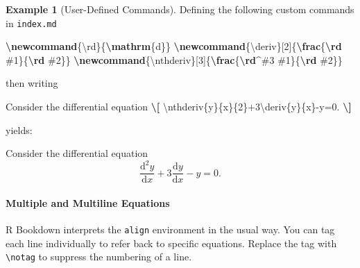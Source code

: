 \documentclass[
]{article}
\newenvironment{Shaded}{\begin{snugshade}}{\end{snugshade}}
\newcommand{\ExtensionTok}[1]{#1}
\newcommand{\FunctionTok}[1]{\textcolor[rgb]{0.13,0.29,0.53}{\textbf{#1}}}
\newcommand{\NormalTok}[1]{#1}
\newcommand{\SpecialCharTok}[1]{\textcolor[rgb]{0.81,0.36,0.00}{\textbf{#1}}}
\numberwithin{equation}{section}
\numberwithin{figure}{section}
\theoremstyle{break}
\theoremstyle{definition}
\theoremstyle{definition}
\newtheorem{example}{Example}[section]
\theoremstyle{definition}
\theoremstyle{definition}
\theoremstyle{remark}
\begin{document}
\begin{example}[User-Defined Commands]
Defining the following custom commands in \texttt{index.md}

\begin{Shaded}
\begin{Highlighting}[]
\FunctionTok{\textbackslash{}newcommand}\NormalTok{\{}\ExtensionTok{\textbackslash{}rd}\NormalTok{\}\{}\FunctionTok{\textbackslash{}mathrm}\NormalTok{\{d\}\}}
\FunctionTok{\textbackslash{}newcommand}\NormalTok{\{}\ExtensionTok{\textbackslash{}deriv}\NormalTok{\}[2]\{}\FunctionTok{\textbackslash{}frac}\NormalTok{\{}\FunctionTok{\textbackslash{}rd}\NormalTok{ \#1\}\{}\FunctionTok{\textbackslash{}rd}\NormalTok{ \#2\}\}}
\FunctionTok{\textbackslash{}newcommand}\NormalTok{\{}\ExtensionTok{\textbackslash{}nthderiv}\NormalTok{\}[3]\{}\FunctionTok{\textbackslash{}frac}\NormalTok{\{}\FunctionTok{\textbackslash{}rd}\NormalTok{\^{}\#3 \#1\}\{}\FunctionTok{\textbackslash{}rd}\NormalTok{ \#2\}\}}
\end{Highlighting}
\end{Shaded}

then writing

\begin{Shaded}
\begin{Highlighting}[]
\NormalTok{Consider the differential equation}
\SpecialCharTok{\textbackslash{}[}
\NormalTok{\textbackslash{}nthderiv\{y\}\{x\}\{2\}+3\textbackslash{}deriv\{y\}\{x\}{-}y=0.}
\SpecialCharTok{\textbackslash{}]}
\end{Highlighting}
\end{Shaded}

yields:

Consider the differential equation
\[
\frac{\mathrm{d}^2 y}{\mathrm{d}x}+3\frac{\mathrm{d}y}{\mathrm{d}x}-y=0.
\]
\end{example}

\hypertarget{multiple-and-multiline-equations}{%
\paragraph*{Multiple and Multiline Equations}\label{multiple-and-multiline-equations}}

R Bookdown interprets the \texttt{align} environment in the usual way. You can tag each line individually to refer back to specific equations. Replace the tag with \texttt{\textbackslash{}notag} to suppress the numbering of a line.
\end{document}
